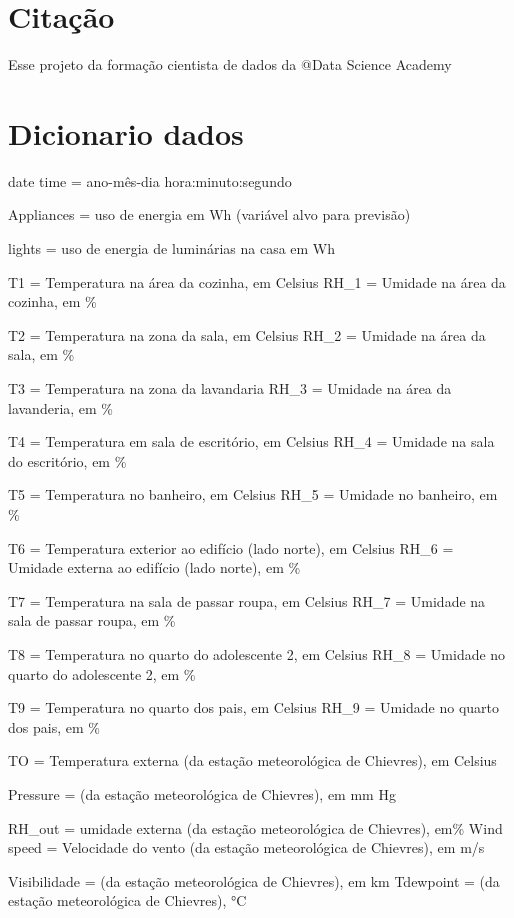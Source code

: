 \documentclass[
]{article}
\begin{document}
\hypertarget{citauxe7uxe3o}{%
\section{Citação}\label{citauxe7uxe3o}}

Esse projeto da formação cientista de dados da @Data Science Academy

\hypertarget{dicionario-dados}{%
\section{Dicionario dados}\label{dicionario-dados}}

date time = ano-mês-dia hora:minuto:segundo

Appliances = uso de energia em Wh (variável alvo para previsão)

lights = uso de energia de luminárias na casa em Wh

T1 = Temperatura na área da cozinha, em Celsius RH\_1 = Umidade na área
da cozinha, em \%

T2 = Temperatura na zona da sala, em Celsius RH\_2 = Umidade na área da
sala, em \%

T3 = Temperatura na zona da lavandaria RH\_3 = Umidade na área da
lavanderia, em \%

T4 = Temperatura em sala de escritório, em Celsius RH\_4 = Umidade na
sala do escritório, em \%

T5 = Temperatura no banheiro, em Celsius RH\_5 = Umidade no banheiro, em
\%

T6 = Temperatura exterior ao edifício (lado norte), em Celsius RH\_6 =
Umidade externa ao edifício (lado norte), em \%

T7 = Temperatura na sala de passar roupa, em Celsius RH\_7 = Umidade na
sala de passar roupa, em \%

T8 = Temperatura no quarto do adolescente 2, em Celsius RH\_8 = Umidade
no quarto do adolescente 2, em \%

T9 = Temperatura no quarto dos pais, em Celsius RH\_9 = Umidade no
quarto dos pais, em \%

TO = Temperatura externa (da estação meteorológica de Chievres), em
Celsius

Pressure = (da estação meteorológica de Chievres), em mm Hg

RH\_out = umidade externa (da estação meteorológica de Chievres), em\%
Wind speed = Velocidade do vento (da estação meteorológica de Chievres),
em m/s

Visibilidade = (da estação meteorológica de Chievres), em km Tdewpoint =
(da estação meteorológica de Chievres), °C
\end{document}
